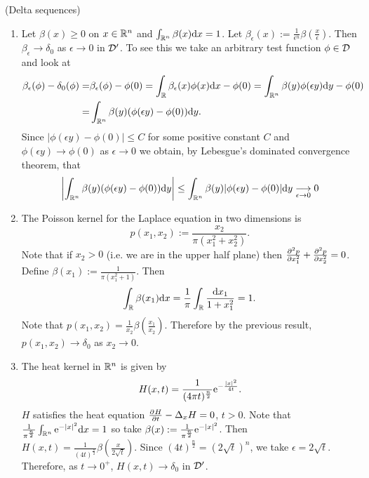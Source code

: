 \documentclass[11pt]{article}
\begin{document}
			\begin{eg}
				(Delta sequences)
				\begin{enumerate}
					\item Let $\beta(x)\ge0$ on $x\in\R^n$ and $\int_{\R^n}\beta(x)\mathrm{d}x=1$. Let $\beta_\epsilon(x):=\frac{1}{\epsilon^n}\beta(\frac{x}{\epsilon})$. Then $\beta_\epsilon\to\delta_0$ as $\epsilon\to 0$ in $\D^\prime$.
					To see this we take an arbitrary test function $\phi\in\D$ and look at
					\begin{align*}
						\beta_\epsilon(\phi)-\delta_0(\phi)=&\beta_\epsilon(\phi)-\phi(0)=\int_{\R}\beta_\epsilon(x)\phi(x)\mathrm{d}x-\phi(0)=\int_{\R^n}\beta(y)\phi(\epsilon y)\mathrm{d}y-\phi(0)\\
						=&\int_{\R^n}\beta(y)(\phi(\epsilon y)-\phi(0))\mathrm{d}y.
					\end{align*} 
					Since $|\phi(\epsilon y)-\phi(0)|\le C$ for some positive constant $C$ and $\phi(\epsilon y)\to\phi(0)$ as $\epsilon\to 0$ we obtain, by Lebesgue's dominated convergence theorem, that
					\begin{equation*}
						\left|\int_{\R^n}\beta(y)(\phi(\epsilon y)-\phi(0))\mathrm{d}y\right|\le\int_{\R^n}\beta(y)|\phi(\epsilon y)-\phi(0)|\mathrm{d}y\underset{\epsilon\to0}{\longrightarrow}0
					\end{equation*}
					\item The Poisson kernel for the Laplace equation in two dimensions is
					\begin{equation*}
						p(x_1,x_2):=\frac{x_2}{\pi(x_1^2+x_2^2)}.
					\end{equation*} 
					Note that if $x_2>0$ (i.e. we are in the upper half plane) then $\del[2]{p}{x_1^2}+\del[2]{p}{x_2^2}=0$. Define $\beta(x_1):=\frac{1}{\pi(x_1^2+1)}$. Then
					\begin{equation*}
						\int_{\R}\beta(x_1)\mathrm{d}x=\frac{1}{\pi}\int_\R\frac{\mathrm{d}x_1}{1+x_1^2}=1.
					\end{equation*}
					Note that $p(x_1,x_2)=\frac{1}{x_2}\beta(\frac{x_1}{x_2})$. Therefore by the previous result, $p(x_1,x_2)\to\delta_0$ as $x_2\to0$.
					\item The heat kernel in $\R^n$ is given by
					\begin{equation*}
						H(x,t)=\frac{1}{(4\pi t)^{\frac{n}{2}}}\e{-\frac{|x|^2}{4t}}.
					\end{equation*} 
					$H$ satisfies the heat equation $\del[]{H}{t}-\Delta_x H=0$, $t>0$. Note that $\frac{1}{\pi^{\frac{n}{2}}}\int_{\R^n}\e{-|x|^2}\mathrm{d}x=1$ so take $\beta(x):=\frac{1}{\pi^{\frac{n}{2}}}\e{-|x|^2}$. Then $H(x,t)=\frac{1}{(4t)^{\frac{n}{2}}}\beta(\frac{x}{2\sqrt{t}})$. Since $(4t)^{\frac{n}{2}}=(2\sqrt{t})^n$, we take $\epsilon=2\sqrt{t}$. Therefore, as $t\to0^+$, $H(x,t)\to\delta_0$ in $\D^\prime$.
				\end{enumerate}
			\end{eg}
\end{document}
